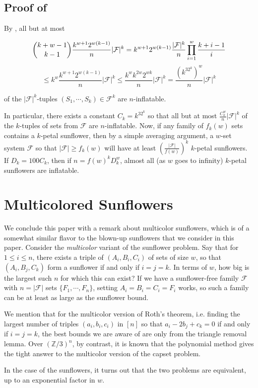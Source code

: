 \documentclass[12pt]{article}
\newcommand{\F}{\mathcal{F}}
\begin{document}
\subsection{Proof of }
By , all but at most 

$$\dbinom{k+w-1}{k-1}\frac{k^{w+1}2^{w(k-1)}}{n}|\F|^k=k^{w+1}2^{w(k-1)}\frac{|\F|^k}{n}\prod_{i=1}^{w} \frac{k+i-1}{i} $$ $$\le k^w\frac{k^{w+1}2^{w(k-1)}}{n}|\F|^k \le \frac{k^wk^{2w}2^{wk}}{n}|\F|^k=\frac{(k^32^k)^w}{n}|\F|^k$$ 

of the $|\F|^k$-tuples $(S_1, \cdots, S_k) \in \F^k$ are $n$-inflatable.

In particular, there exists a constant $C_k=k^32^k$ so that all but at most $\frac{C_k^w}{n}|\F|^k$ of the $k$-tuples of sets from $\F$ are $n$-inflatable. Now, if any family of $f_k(w)$ sets contains a $k$-petal sunflower, then by a simple averaging argument, a $w$-set system $\F$ so that $|\F| \ge f_k(w)$ will have at least $\left(\frac{|\F|}{f(w)}\right)^k$ $k$-petal sunflowers. If $D_k=100C_k$, then if $n=f(w)^kD_k^w$,  almost all (as $w$ goes to infinity) $k$-petal sunflowers are inflatable.

\section{Multicolored Sunflowers}

We conclude this paper with a remark about multicolor sunflowers, which is of a somewhat similar flavor to the blown-up sunflowers that we consider in this paper.  Consider the \emph{multicolor} variant of the sunflower problem.  Say that for $1 \le i \le n$, there exists a triple of $(A_i,B_i,C_i)$ of sets of size $w$, so that $(A_i,B_j,C_k)$ form a sunflower if and only if $i=j=k$.  In terms of $w$, how big is the largest such $n$ for which this can exist?  If we have a sunflower-free family $\F$  with $n=|\F|$ sets $\{F_1, \cdots, F_n\}$, setting $A_i=B_i=C_i=F_i$ works, so such a family can be at least as large as the sunflower bound.

We mention that for the multicolor version of Roth's theorem, i.e. finding the largest number of triples $(a_i, b_i, c_i)$ in $[n]$ so that $a_i-2b_j+c_k=0$ if and only if $i=j=k$, the best bounds we are aware of are only from the triangle removal lemma.  Over $(\mathbb{Z}/3)^n$, by contrast, it is known \cite{kss} that the polynomial method gives the tight answer to the multicolor version of the capset problem.

In the case of the sunflowers, it turns out that the two problems are equivalent, up to an exponential factor in $w$.
\end{document}

